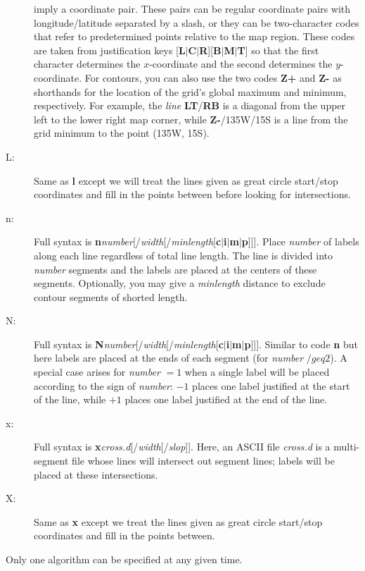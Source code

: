 \begin{description}
imply a coordinate pair.  These pairs can be regular coordinate pairs with longitude/latitude separated by a slash, or they
can be two-character codes that refer to predetermined points relative to the map region.  These codes
are taken from  justification keys [{\bf L$|$C$|$R}][{\bf B$|$M$|$T}] so that the first
character determines the $x$-coordinate and the second determines the $y$-coordinate.  For contours,
you can also use the two codes {\bf Z+} and {\bf Z-} as shorthands for the location of the grid's global
maximum and minimum, respectively.  For example, the {\it line} {\bf LT}/{\bf RB} is a diagonal from the
upper left to the lower right map corner, while {\bf Z-}/135W/15S is a line from the grid minimum to the point
(135\DS W, 15\DS S).
\item [L:] Same as {\bf l} except we will treat the lines given as great circle start/stop coordinates and fill in
the points between before looking for intersections.
\item [n:] Full syntax is {\bf n}{\it number}[/{\it width}[/{\it minlength}[{\bf c$|$i$|$m$|$p}]]].  Place
{\it number} of labels along each line regardless of total line length.  The line is divided into {\it number}
segments and the labels are placed at the centers of these segments.  Optionally, you may give a {\it minlength}
distance to exclude contour segments of shorted length.
\item [N:] Full syntax is {\bf N}{\it number}[/{\it width}[/{\it minlength}[{\bf c$|$i$|$m$|$p}]]].  Similar to
code {\bf n} but here labels are placed at the ends of each segment (for {\it number} $ /geq 2$).  A special
case arises for {\it number} $= 1$ when a single label will be placed according to the sign of {\it number}:
$-1$ places one label justified at the start of the line, while $+1$ places one label justified at the end of the line.
\item [x:] Full syntax is {\bf x}{\it cross.d}[/{\it width}[/{\it slop}]].  Here, an ASCII file {\it cross.d} is
a multi-segment file whose lines will intersect out segment lines; labels will be placed at these intersections.
\item [X:] Same as {\bf x} except we treat the lines given as great circle start/stop coordinates and fill in the
points between.
\end{description}
Only one algorithm can be specified at any given time.

